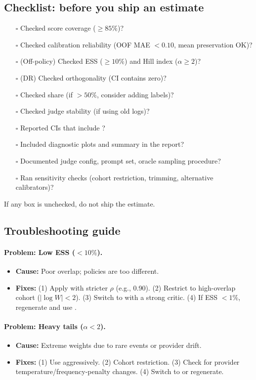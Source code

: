 \subsection{Checklist: before you ship an estimate}

\begin{enumerate}
\item[$\square$] Checked score coverage ($\ge 85\%$)?
\item[$\square$] Checked calibration reliability (OOF MAE $< 0.10$, mean preservation OK)?
\item[$\square$] (Off-policy) Checked ESS ($\ge 10\%$) and Hill index ($\alpha \ge 2$)?
\item[$\square$] (DR) Checked orthogonality (CI contains zero)?
\item[$\square$] Checked \oua{} share (if $> 50\%$, consider adding labels)?
\item[$\square$] Checked judge stability (if using old logs)?
\item[$\square$] Reported CIs that include \oua?
\item[$\square$] Included diagnostic plots and summary in the report?
\item[$\square$] Documented judge config, prompt set, oracle sampling procedure?
\item[$\square$] Ran sensitivity checks (cohort restriction, trimming, alternative calibrators)?
\end{enumerate}

If any box is unchecked, do not ship the estimate.

\subsection{Troubleshooting guide}

\paragraph{Problem: Low ESS ($< 10\%$).}
\begin{itemize}
\item \textbf{Cause:} Poor overlap; policies are too different.
\item \textbf{Fixes:} (1) Apply \simcal{} with stricter $\rho$ (e.g., 0.90). (2) Restrict to high-overlap cohort ($|\log W| < 2$). (3) Switch to \dr{} with a strong critic. (4) If ESS $< 1\%$, regenerate and use \dm.
\end{itemize}

\paragraph{Problem: Heavy tails ($\alpha < 2$).}
\begin{itemize}
\item \textbf{Cause:} Extreme weights due to rare events or provider drift.
\item \textbf{Fixes:} (1) Use \simcal{} aggressively. (2) Cohort restriction. (3) Check for provider temperature/frequency-penalty changes. (4) Switch to \dr{} or regenerate.
\end{itemize}

